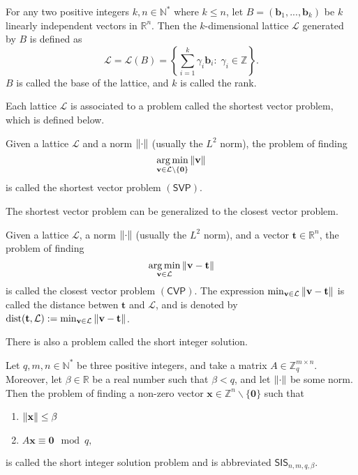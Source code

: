 \begin{definition}[Lattice]
For any two positive integers $k, n \in \mathbb{N}^*$ where $k \leq n$, let $B=(\mathbf{b}_1, ... , \mathbf{b}_k)$ be $k$ linearly independent vectors in $\mathbb{R}^n$. Then the $k$-dimensional lattice $\mathcal{L}$ generated by $B$ is defined as
$$\mathcal{L} = \mathcal{L}(B) = \left\{ \sum_{i=1}^k \gamma_i \mathbf{b}_i : \; \gamma_i \in \mathbb{Z} \right\}.$$
$B$ is called the base of the lattice, and $k$ is called the rank.
\end{definition}

Each lattice $\mathcal{L}$ is associated to a problem called the shortest vector problem, which is defined below.

\begin{definition}\label{def:svp}
Given a lattice $\mathcal{L}$ and a norm $\left\lVert\cdot\right\rVert$ (usually the $L^2$ norm), the problem of finding
$$\operatorname*{arg\,min}_{\mathbf{v} \in \mathcal{L}\backslash\{\mathbf{0}\}} \left\lVert\mathbf{v}\right\rVert$$
is called the shortest vector problem $\mathsf{(SVP)}$.
\end{definition}

The shortest vector problem can be generalized to the closest vector problem.

\begin{definition}\label{def:cvp}
Given a lattice $\mathcal{L}$, a norm $\left\lVert\cdot\right\rVert$ (usually the $L^2$ norm), and a vector $\mathbf{t} \in \mathbb{R}^n$, the problem of finding
$$\operatorname*{arg\,min}_{\mathbf{v} \in \mathcal{L}} \left\lVert\mathbf{v}-\mathbf{t}\right\rVert$$
is called the closest vector problem $\mathsf{(CVP)}$. The expression $\min_{\mathbf{v} \in \mathcal{L}} \left\lVert\mathbf{v}-\mathbf{t}\right\rVert$ is called the distance betwen $\mathbf{t}$ and $\mathcal{L}$, and is denoted by  $ \textnormal{dist}(\mathbf{t}, \mathcal{L}) := \min_{\mathbf{v} \in \mathcal{L}} \left\lVert\mathbf{v}-\mathbf{t}\right\rVert$.
\end{definition}

There is also a problem called the short integer solution.
\begin{definition}\label{def:sis}
Let $q, m, n \in \mathbb{N}^*$ be three positive integers, and take a matrix $A \in \mathbb{Z}_q^{m \times n}$. Moreover, let $\beta \in \mathbb{R}$ be a real number such that $\beta < q$, and let $\left\lVert\cdot\right\rVert$ be some norm. Then the problem of finding a non-zero vector $\mathbf{x} \in \mathbb{Z}^n \backslash \{\mathbf{0}\}$ such that
\begin{enumerate}[label=(\roman{*}),labelsep=2em]
\itemindent=140pt
\item $\left\lVert\mathbf{x}\right\rVert \leq \beta$ \label{misc:sis_norm_cond}
\item $A \mathbf{x} \equiv \mathbf{0} \mod q,$ \label{misc:sis_eq}
\end{enumerate}
is called the short integer solution problem and is abbreviated $\mathsf{SIS}_{n,m,q,\beta}$.
\end{definition}

